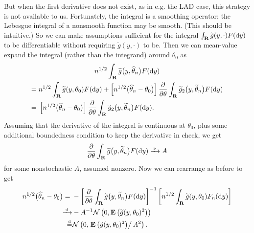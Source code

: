 \documentclass[11pt,letterpaper,reqno,oneside]{article}
\begin{document}
But when the first derivative does not exist, as in e.g. the LAD case, this strategy is not available to us. Fortunately, the integral is a smoothing operator: the Lebesgue integral of a nonsmooth function may be smooth. (This should be intuitive.) So we can make assumptions sufficient for the integral $\int_{\mathbf{R}} \widetilde{g}( y, \cdot ) F(\mathrm{d} y)$ to be differentiable without requiring $\widetilde{g}(y,\cdot)$ to be. Then we can mean-value expand the integral (rather than the integrand) around $\theta_0$ as
%
\begin{multline*}
	n^{1/2} \int_{\mathbf{R}} \widetilde{g}\bigl( y, \widehat{\theta}_n \bigr) F(\mathrm{d} y)
	\\
	\begin{aligned}
		={}& n^{1/2} \int_{\mathbf{R}} \widetilde{g}( y, \theta_0 ) F(\mathrm{d} y)
		+ \left[ n^{1/2} \bigl( \widehat{\theta}_n - \theta_0 \bigr) \right]
		\frac{\partial}{\partial \theta}
		\int_{\mathbf{R}} \widetilde{g}_2\bigl( y, \widetilde{\theta}_n \bigr) F(\mathrm{d} y)
		\\
		={}& \left[ n^{1/2} \bigl( \widehat{\theta}_n - \theta_0 \bigr) \right]
		\frac{\partial}{\partial \theta}
		\int_{\mathbf{R}} \widetilde{g}_2\bigl( y, \widetilde{\theta}_n \bigr) F(\mathrm{d} y) .
	\end{aligned}
\end{multline*}
%
Assuming that the derivative of the integral is continuous at $\theta_0$, plus some additional boundedness condition to keep the derivative in check, we get
%
\begin{equation*}
	\frac{\partial}{\partial \theta}
	\int_{\mathbf{R}} \widetilde{g}\bigl( y, \widetilde{\theta}_n \bigr) F(\mathrm{d} y)
	\xrightarrow{{\scriptscriptstyle \mathrm{\;p\;}}} A 
\end{equation*}
%
for some nonstochastic $A$, assumed nonzero. Now we can rearrange as before to get
%
\begin{align*}
	n^{1/2} \bigl( \widehat{\theta}_n - \theta_0 \bigr) 
	={}& - \left[ \frac{\partial}{\partial \theta}
	\int_{\mathbf{R}} \widetilde{g}\bigl( y, \widetilde{\theta}_n \bigr) F(\mathrm{d} y) \right]^{-1}
	\left[ n^{1/2} \int_{\mathbf{R}} \widetilde{g}( y, \theta_0 ) F_n(\mathrm{d} y) \right]
	\\
	\xrightarrow{{\scriptscriptstyle \mathrm{\;d\;}}}& - A^{-1}
	\mathcal{N}\left( 0, \mathbf{E}\left( \widetilde{g}( y, \theta_0 )^2 \right) \right)
	\\
	\protect\overset{{\scriptscriptstyle \mathrm{d}}}{=}& \mathcal{N}\left( 0, 
	\left. \mathbf{E}\left( \widetilde{g}( y, \theta_0 )^2 \right) \right/
	A^2 \right) .
\end{align*}
\end{document}
